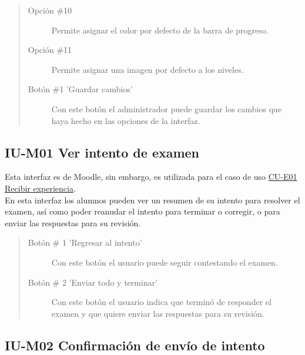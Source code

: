     \begin{quote}
    \begin{description}
    	\item[Opción \#10] Permite asignar el color por defecto de la barra de progreso.
    	\item[Opción \#11] Permite asignar una imagen por defecto a los niveles.
    	\item[Botón \#1 'Guardar cambios'] Con este botón el administrador puede guardar los cambios que haya hecho en las opciones de la interfaz.
    \end{description}
    \end{quote}

\clearpage

\subsection*{IU-M01 Ver intento de examen}
\label{IUM01}

    Esta interfaz es de Moodle, sin embargo, es utilizada para el caso de uso \hyperref[CU-E01]{CU-E01 Recibir experiencia}.\\

    \noindent En esta interfaz los alumnos pueden ver un resumen de su intento para resolver el examen, así como poder reanudar el intento para terminar o corregir, o para enviar las respuestas para su revisión.


    \begin{quote}
    \begin{description}
    	\item[Botón \# 1 'Regresar al intento'] Con este botón el usuario puede seguir contestando el examen.
    	\item[Botón \# 2 'Enviar todo y terminar'] Con este botón el usuario indica que terminó de responder el examen y que quiere enviar las respuestas para su revisión.
    \end{description}
    \end{quote}
	\clearpage

\subsection*{IU-M02 Confirmación de envío de intento}
\label{IUM02}

